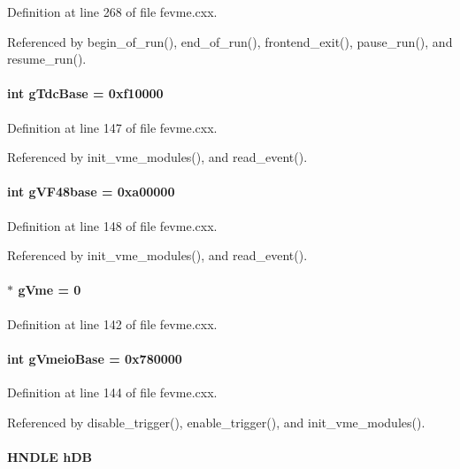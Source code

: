 Definition at line 268 of file fevme.cxx.

Referenced by begin\_\-of\_\-run(), end\_\-of\_\-run(), frontend\_\-exit(), pause\_\-run(), and resume\_\-run().
\paragraph[{gTdcBase}]{\setlength{\rightskip}{0pt plus 5cm}int {\bf gTdcBase} = 0xf10000}\hfill\label{fevme_8cxx_ad4384f6adeaf777597b7a796c1bf576a}


Definition at line 147 of file fevme.cxx.

Referenced by init\_\-vme\_\-modules(), and read\_\-event().
\paragraph[{gVF48base}]{\setlength{\rightskip}{0pt plus 5cm}int {\bf gVF48base} = 0xa00000}\hfill\label{fevme_8cxx_a23c7e9e0650db134c814ef69abc336e5}


Definition at line 148 of file fevme.cxx.

Referenced by init\_\-vme\_\-modules(), and read\_\-event().
\paragraph[{gVme}]{$\ast$ {\bf gVme} = 0}\hfill\label{fevme_8cxx_a79e5e8ddc330f519595697b81f787624}


Definition at line 142 of file fevme.cxx.
\paragraph[{gVmeioBase}]{\setlength{\rightskip}{0pt plus 5cm}int {\bf gVmeioBase} = 0x780000}\hfill\label{fevme_8cxx_acc789e68da929623fdc163cccab5b0bc}


Definition at line 144 of file fevme.cxx.

Referenced by disable\_\-trigger(), enable\_\-trigger(), and init\_\-vme\_\-modules().
\paragraph[{hDB}]{\setlength{\rightskip}{0pt plus 5cm}HNDLE {\bf hDB}}\hfill\label{fevme_8cxx_ab1f60c53f74e806a3b9f687af38d7421}


